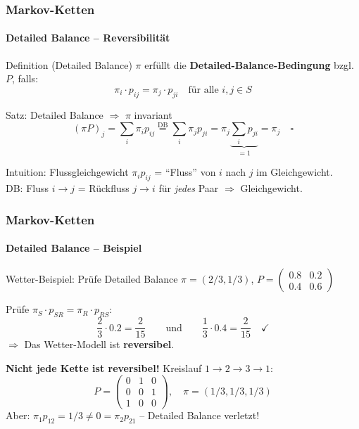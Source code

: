 \documentclass{beamer}
\begin{document}

\begin{frame}
    \frametitle{Markov-Ketten}
\framesubtitle{Detailed Balance -- Reversibilität}
    \begin{block}{Definition (Detailed Balance)}
$\pi$ erfüllt die \textbf{Detailed-Balance-Bedingung} bzgl. $P$, falls:
\[
\pi_i \cdot p_{ij} = \pi_j \cdot p_{ji} \quad \text{für alle } i, j \in S
\]
\end{block}
\begin{block}{Satz: Detailed Balance $\Rightarrow$ $\pi$ invariant}
\[
(\pi P)_j = \sum_i \pi_i p_{ij} \overset{\text{DB}}{=} \sum_i \pi_j p_{ji} = \pi_j \underbrace{\sum_i p_{ji}}_{=1} = \pi_j \quad \square
\]
\end{block}
\begin{block}{Intuition: Flussgleichgewicht}
$\pi_i p_{ij}$ = ``Fluss'' von $i$ nach $j$ im Gleichgewicht.\\
DB: Fluss $i \to j$ = Rückfluss $j \to i$ für \emph{jedes} Paar $\Rightarrow$ Gleichgewicht.
\end{block}
 \end{frame}



\begin{frame}
    \frametitle{Markov-Ketten}
\framesubtitle{Detailed Balance -- Beispiel}
    \begin{block}{Wetter-Beispiel: Prüfe Detailed Balance}
$\pi = (2/3, 1/3)$, \quad $P = \begin{pmatrix} 0.8 & 0.2 \\ 0.4 & 0.6\end{pmatrix}$
\end{block}
Prüfe $\pi_S \cdot p_{SR} = \pi_R \cdot p_{RS}$:
\[
\frac{2}{3} \cdot 0.2 = \frac{2}{15} \qquad \text{und} \qquad \frac{1}{3} \cdot 0.4 = \frac{2}{15} \quad \checkmark
\]
$\Rightarrow$ Das Wetter-Modell ist \textbf{reversibel}.

\vspace{0.2cm}
\textbf{Nicht jede Kette ist reversibel!} Kreislauf $1 \to 2 \to 3 \to 1$:
\[
P = \begin{pmatrix} 0 & 1 & 0 \\ 0 & 0 & 1 \\ 1 & 0 & 0 \end{pmatrix}, \quad
\pi = (1/3, 1/3, 1/3)
\]
Aber: $\pi_1 p_{12} = 1/3 \neq 0 = \pi_2 p_{21}$ -- Detailed Balance verletzt!
 \end{frame}
\end{document}
